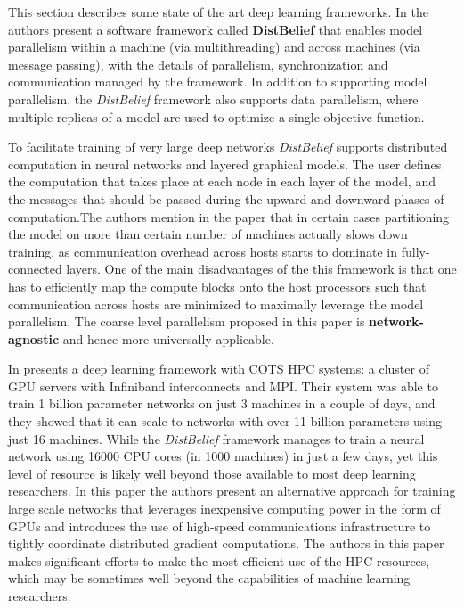 This section describes some state of the art deep learning frameworks.
In \cite{JeffDean2012} the authors present a software framework called \textbf{DistBelief} that enables model parallelism within a machine (via multithreading) and across machines (via message passing), with the details of parallelism, synchronization and communication managed by
the framework. In addition to supporting model parallelism, the \emph{DistBelief} framework also supports
data parallelism, where multiple replicas of a model are used to optimize a single objective function.

To facilitate training of very large deep networks \emph{DistBelief} supports distributed computation in neural networks and layered graphical models. The user defines the computation that takes place at each node in each layer of the model, and the messages that should be passed during the upward and downward phases of computation.The authors mention in the paper that in certain cases partitioning the model on more than certain number of machines actually slows down training, as communication overhead across hosts starts to dominate in fully-connected layers. One of the main disadvantages of the this framework is that one has to efficiently map the compute blocks onto the host processors such that communication across hosts are minimized to maximally leverage the model parallelism. The coarse level parallelism proposed in this paper is \textbf{network-agnostic} and hence more universally applicable.

In \cite{Coates2013}  presents a deep learning framework with COTS HPC systems: a cluster of GPU servers with Infiniband interconnects and MPI. Their system was able to train 1 billion parameter networks on just 3 machines in a couple of days, and they showed that it can scale to networks with over
11 billion parameters using just 16 machines. While the \emph{DistBelief} framework manages to train a neural network using 16000
CPU cores (in 1000 machines) in just a few days, yet this level of resource is likely well beyond those available to most deep learning researchers.
In this paper the authors present an alternative approach for training large scale networks that leverages inexpensive
computing power in the form of GPUs and introduces the use of high-speed communications infrastructure to tightly coordinate distributed gradient
computations. The authors in this paper makes significant efforts to make the most efficient use of the HPC resources, which may be sometimes well beyond the capabilities of machine learning researchers.

